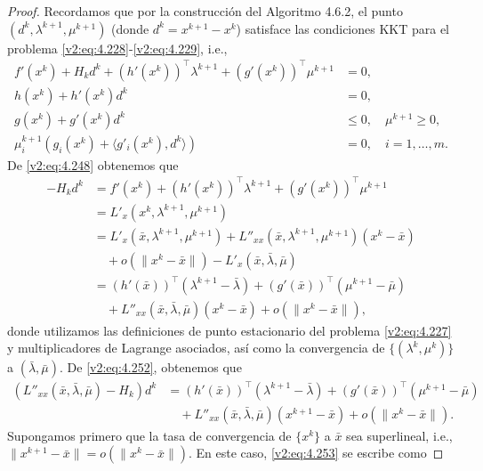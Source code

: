 \begin{proof}
    Recordamos que por la construcción del Algoritmo 4.6.2, el punto $(d^k, \lambda^{k+1}, \mu^{k+1})$ (donde $d^k = x^{k+1} - x^k$) satisface las condiciones KKT para el problema \eqref{v2:eq:4.228}-\eqref{v2:eq:4.229}, i.e.,
    \begin{align}
        f'(x^k) + H_k d^k + (h'(x^k))^\top \lambda^{k+1} + (g'(x^k))^\top \mu^{k+1} &= 0, \label{v2:eq:4.248} \\
        h(x^k) + h'(x^k)d^k &= 0, \label{v2:eq:4.249} \\
        g(x^k) + g'(x^k)d^k &\le 0, \quad \mu^{k+1} \ge 0, \label{v2:eq:4.250} \\
        \mu_i^{k+1}(g_i(x^k) + \langle g'_i(x^k), d^k \rangle) &= 0, \quad i = 1, \dots, m. \label{v2:eq:4.251}
    \end{align}
    De \eqref{v2:eq:4.248} obtenemos que
    \begin{align}
        -H_k d^k &= f'(x^k) + (h'(x^k))^\top \lambda^{k+1} + (g'(x^k))^\top \mu^{k+1} \nonumber \\
        &= L'_x(x^k, \lambda^{k+1}, \mu^{k+1}) \nonumber \\
        &= L'_x(\bar{x}, \lambda^{k+1}, \mu^{k+1}) + L''_{xx}(\bar{x}, \lambda^{k+1}, \mu^{k+1})(x^k - \bar{x}) \nonumber \\
        &\quad + o(\|x^k - \bar{x}\|) - L'_x(\bar{x}, \bar{\lambda}, \bar{\mu}) \nonumber \\
        &= (h'(\bar{x}))^\top(\lambda^{k+1} - \bar{\lambda}) + (g'(\bar{x}))^\top(\mu^{k+1} - \bar{\mu}) \nonumber \\
        &\quad + L''_{xx}(\bar{x}, \bar{\lambda}, \bar{\mu})(x^k - \bar{x}) + o(\|x^k - \bar{x}\|),
        \label{v2:eq:4.252}
    \end{align}
    donde utilizamos las definiciones de punto estacionario del problema \eqref{v2:eq:4.227} y multiplicadores de Lagrange asociados, así como la convergencia de $\{(\lambda^k, \mu^k)\}$ a $(\bar{\lambda}, \bar{\mu})$. De \eqref{v2:eq:4.252}, obtenemos que
    \begin{align}
        (L''_{xx}(\bar{x}, \bar{\lambda}, \bar{\mu}) - H_k)d^k &= (h'(\bar{x}))^\top(\lambda^{k+1} - \bar{\lambda}) + (g'(\bar{x}))^\top(\mu^{k+1} - \bar{\mu}) \nonumber \\
        &\quad + L''_{xx}(\bar{x}, \bar{\lambda}, \bar{\mu})(x^{k+1} - \bar{x}) + o(\|x^k - \bar{x}\|).
        \label{v2:eq:4.253}
    \end{align}
    Supongamos primero que la tasa de convergencia de $\{x^k\}$ a $\bar{x}$ sea superlineal, i.e., $\|x^{k+1} - \bar{x}\| = o(\|x^k - \bar{x}\|)$. En este caso, \eqref{v2:eq:4.253} se escribe como

\end{proof}
